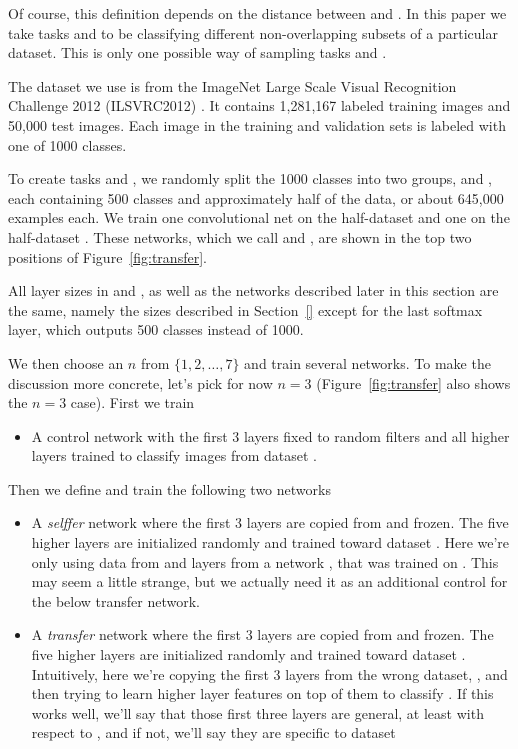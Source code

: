 Of course, this definition depends on the distance between \dA and \dB. In this paper we take tasks \dA and \dB to be classifying different non-overlapping subsets of a particular dataset.   This is only one possible way of sampling tasks \dA and \dB.

The dataset we use is from the ImageNet Large Scale Visual Recognition Challenge 2012 (ILSVRC2012) \citep{imagenet_cvpr09}. It contains 1,281,167 labeled training images and 50,000 test images. Each image in the training and validation sets is labeled with one of 1000 classes.

To create tasks \dA and \dB, we randomly split the 1000 classes into two groups, \dA and \dB, each containing 500 classes and approximately half of the data, or about 645,000 examples each. We train one convolutional net on the half-dataset \dA and one on the half-dataset \dB. These networks, which we call  and , are shown in the top two positions of Figure~\ref{fig:transfer}.

All layer sizes in  and , as well as the networks described later in this section are the same, namely the sizes described in Section~\ref{} except for the last softmax layer, which outputs 500 classes instead of 1000.


We then choose an $n$ from $\{1, 2, \ldots, 7\}$ and train several networks. To make the discussion more concrete, let's pick for now $n=3$ (Figure~\ref{fig:transfer} also shows the $n=3$ case). First we train 

\begin{itemize}
\item A control network  with the first $3$ layers fixed to random filters and all higher layers trained to classify images from dataset \dB.
\end{itemize}

Then we define and train the following two networks

\begin{itemize}
\item A \emph{selffer} network  where the first $3$ layers are copied from  and frozen. The five higher layers are initialized randomly and trained toward dataset \dB. Here we're only using data from \dB and layers from a network , that was trained on \dB. This may seem a little strange, but we actually need it as an additional control for the below transfer network.

\item A \emph{transfer} network  where the first $3$ layers are copied from  and frozen. The five higher layers are initialized randomly and trained toward dataset \dB. Intuitively, here we're copying the first $3$ layers from the wrong dataset, \dA,  and then trying to learn higher layer features on top of them to classify \dB. If this works well, we'll say that those first three layers are general, at least with respect to \dB, and if not, we'll say they are specific to dataset \dA
\end{itemize}

